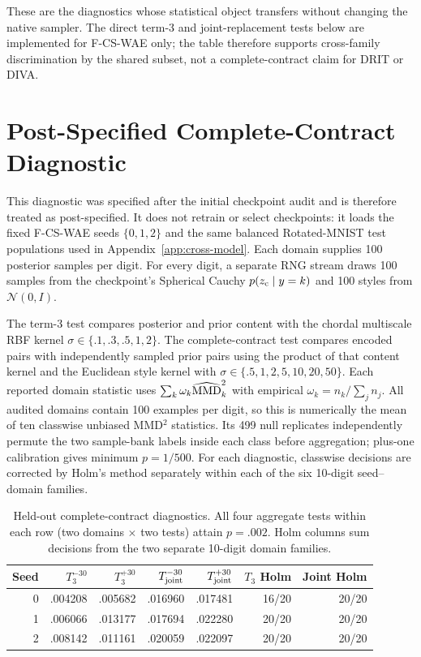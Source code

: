 These are the diagnostics whose statistical object transfers without changing
the native sampler.  The direct term-3 and joint-replacement tests below are
implemented for F-CS-WAE only; the table therefore supports cross-family
discrimination by the shared subset, not a complete-contract claim for DRIT
or DIVA.

\section{Post-Specified Complete-Contract Diagnostic}
\label{app:complete-contract}

This diagnostic was specified after the initial checkpoint audit and is
therefore treated as post-specified.  It does not retrain or select
checkpoints: it loads the fixed
F-CS-WAE seeds $\{0,1,2\}$ and the same balanced Rotated-MNIST test
populations used in Appendix~\ref{app:cross-model}.  Each domain supplies
100 posterior samples per digit.  For every digit, a separate RNG stream draws
100 samples from the checkpoint's Spherical Cauchy
$p(z_{\mathrm{c}}\mid y=k)$ and 100 styles from $\mathcal N(0,I)$.

The term-3 test compares posterior and prior content with the chordal
multiscale RBF kernel $\sigma\in\{.1,.3,.5,1,2\}$.  The complete-contract test
compares encoded pairs with independently sampled prior pairs using the
product of that content kernel and the Euclidean style kernel with
$\sigma\in\{.5,1,2,5,10,20,50\}$.  Each reported domain statistic uses
$\sum_k\omega_k\widehat{\mathrm{MMD}}_k^2$ with empirical
$\omega_k=n_k/\sum_jn_j$.  All audited domains contain 100 examples per digit,
so this is numerically the mean of ten classwise unbiased MMD$^2$ statistics.
Its 499 null
replicates independently permute the two sample-bank labels inside each
class before aggregation; plus-one calibration gives minimum $p=1/500$.
For each diagnostic, classwise decisions are corrected by Holm's method
separately within each of the six 10-digit seed--domain families.

\begin{table}[ht]
\caption{Held-out complete-contract diagnostics.  All four aggregate tests
within each row (two domains $\times$ two tests) attain $p=.002$.  Holm
columns sum decisions from the two separate 10-digit domain families.}
\label{tab:complete-contract}
\centering
\scriptsize
\setlength{\tabcolsep}{3.5pt}
\begin{tabular}{rrrrrrr}
\toprule
Seed & $T_3^{-30}$ & $T_3^{+30}$ & $T_{\rm joint}^{-30}$ & $T_{\rm joint}^{+30}$ & $T_3$ Holm & Joint Holm \\
\midrule
0 & .004208 & .005682 & .016960 & .017481 & 16/20 & 20/20 \\
1 & .006066 & .013177 & .017694 & .022280 & 20/20 & 20/20 \\
2 & .008142 & .011161 & .020059 & .022097 & 20/20 & 20/20 \\
\bottomrule
\end{tabular}
\end{table}

